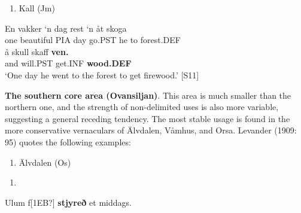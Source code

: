\begin{enumerate} %
\item 
Kall (Jm)

\end{enumerate} %
\ea\label{}
\gll En  vakker  ‘n  dag  rest  ‘n  åt  skoga\\


one  beautiful  PIA  day  go.PST  he  to  forest.DEF\\ %


\ea\label{}
\gll å  skull  skaff  \textbf{ven.}\\


and  will.PST  get.INF  \textbf{wood.DEF}\\ %


‘One day he went to the forest to get firewood.’ [S11]
\z

\textbf{The southern core area (Ovansiljan)}. This area is much smaller than the northern one, and the strength of non-delimited uses is also more variable, suggesting a general receding tendency. The most stable usage is found in the more conservative vernaculars of Älvdalen, Våmhus, and Orsa. Levander (1909: 95) quotes the following examples:

\begin{enumerate} %
\item 
Älvdalen (Os)

\end{enumerate} %
\setcounter{listLFOxcviiileveli}{0}
\begin{enumerate} %
\item 
\end{enumerate} %
\ea\label{}
\gll Ulum  f[1EB?]  \textbf{stjyreð} et  middags.  \\


